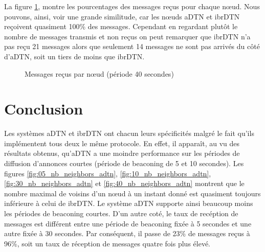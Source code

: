 \documentclass[a4paper,10pt]{article}
\begin{document}
La figure \ref{fig:40_msg_rcv}, montre les pourcentages des messages reçus pour chaque nœud. Nous pouvons, ainsi, voir une grande similitude, car les nœuds aDTN et ibrDTN reçoivent quasiment 100\% des messages. Cependant en regardant plutôt le nombre de messages transmis et non reçus on peut remarquer que ibrDTN n’a pas reçu 21 messages alors que seulement 14 messages ne sont pas arrivés du côté d'aDTN, soit un tiers de moins que ibrDTN.

\begin{figure}[h!]
    \centering
    \caption{Messages reçus par nœud (période 40 secondes)}
    \label{fig:40_msg_rcv}
\end{figure}

\newpage

\section{Conclusion}
Les systèmes aDTN et ibrDTN ont chacun leurs spécificités malgré le fait qu’ils implémentent tous deux le même protocole.
En effet, il apparaît, au vu des résultats obtenus, qu'aDTN a une moindre performance sur les périodes de diffusion d'annonces courtes (période de beaconing de 5 et 10 secondes). Les figures \ref{fig:05_nb_neighbors_adtn}, \ref{fig:10_nb_neighbors_adtn}, \ref{fig:30_nb_neighbors_adtn} et \ref{fig:40_nb_neighbors_adtn} montrent que le nombre maximal de voisins d'un nœud à un instant donné est quasiment toujours inférieure à celui de ibrDTN. Le système aDTN supporte ainsi beaucoup moins les périodes de beaconing courtes. D'un autre coté, le taux de recéption de messages est différent entre une période de beaconing fixée à 5 secondes et une autre fixée à 30 secondes. Par conséquent, il passe de 23\% de messages reçus à 96\%, soit un taux de réception de messages quatre fois plus élevé. \par
\end{document}
